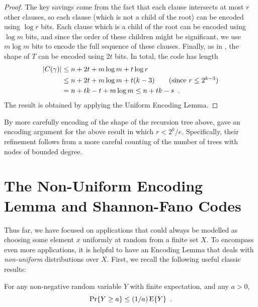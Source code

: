 \documentclass[format=acmsmall, review=false, screen=true]{acmart}
\begin{document}
\begin{proof}
  The key savings come from the fact that each clause intersects at
  most $r$ other clauses, so each clause (which is not a child of the
  root) can be encoded using $\log r$ bits. Each clause which is a
  child of the root can be encoded using $\log m$ bits, and since the
  order of these children might be significant, we use $m \log m$ bits
  to encode the full sequence of these clauses. Finally, as in
  , the shape of $T$ can be encoded
  using $2t$ bits. In total, the code has length
  \begin{align*}
    |C(\gamma)| &\le n + 2t + m\log m+ t \log r \\
    &\le n + 2t + m\log m + t(k - 3) \tag{since $r \le 2^{k - 3}$} \\
    &= n + tk - t + m\log m 
    \le n + tk - s \enspace .
  \end{align*}
  The result is obtained by applying the Uniform Encoding Lemma.
\end{proof}

\begin{rem}
  By more carefully encoding of the shape of the recursion tree above,
   gave an encoding argument
  for the above result in which $r < 2^k/e$. Specifically, their 
  refinement follows
  from a more careful counting of the number of trees with nodes of
  bounded degree.
\end{rem}

\section{The Non-Uniform Encoding Lemma and Shannon-Fano Codes}

Thus far, we have focused on applications that could always be
modelled as choosing some element $x$ uniformly at random from a
finite set $X$. To encompass even more applications, it is helpful to
have an Encoding Lemma that deals with \emph{non-uniform}
distributions over $X$. First, we recall the following useful classic
results: 
\begin{thm}
  For any non-negative random variable $Y$ with finite
  expectation, and any $a > 0$,
  \[
    \Pr\{Y \geq a\} \leq (1/a) \operatorname{\mathrm{E}}\{Y\} \enspace .
  \]
\end{thm}
\end{document}
